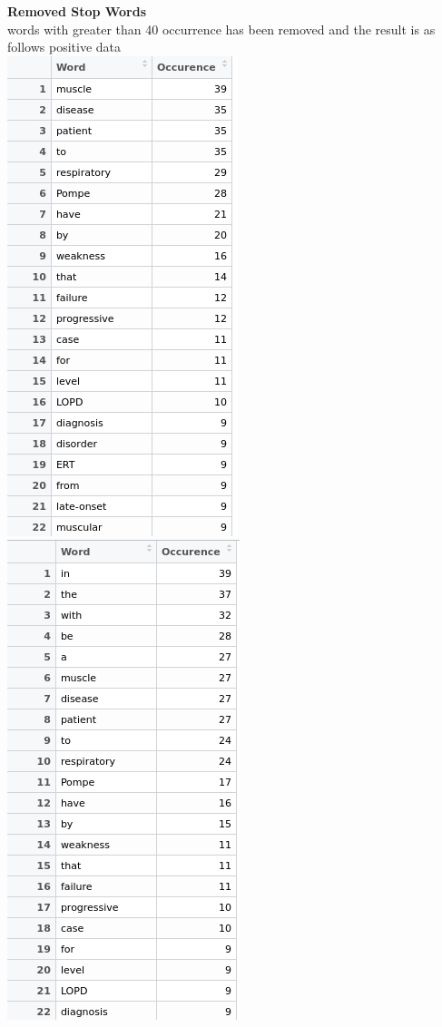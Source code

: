 \documentclass{article}
\begin{document}
 {\LARGE \textbf {Removed Stop Words}}\\
 words with greater than 40 occurrence has been removed and the result is as follows 
  positive data\\
  \includegraphics[width=0.6\linewidth]{Rem_stop_words.png}
  \includegraphics[width=0.6\linewidth]{Rem_stop_words_uni.png}\\
\end{document}
